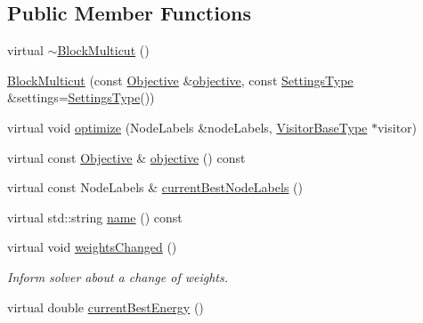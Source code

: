 \subsection*{Public Member Functions}
\begin{DoxyCompactItemize}
\item 
virtual \hyperlink{classnifty_1_1graph_1_1optimization_1_1multicut_1_1BlockMulticut_a79b2fe4e7494b9d433b6f738814f3c81}{$\sim$\+Block\+Multicut} ()
\item 
\hyperlink{classnifty_1_1graph_1_1optimization_1_1multicut_1_1BlockMulticut_a17d06855beeea288f7239376937f2930}{Block\+Multicut} (const \hyperlink{classnifty_1_1graph_1_1optimization_1_1multicut_1_1BlockMulticut_a4687a9c2304a995a612e69abc3b1b37f}{Objective} \&\hyperlink{classnifty_1_1graph_1_1optimization_1_1multicut_1_1BlockMulticut_a0a0c27b7eb28c0cb85b8369ab85e3cc6}{objective}, const \hyperlink{structnifty_1_1graph_1_1optimization_1_1multicut_1_1BlockMulticut_1_1SettingsType}{Settings\+Type} \&settings=\hyperlink{structnifty_1_1graph_1_1optimization_1_1multicut_1_1BlockMulticut_1_1SettingsType}{Settings\+Type}())
\item 
virtual void \hyperlink{classnifty_1_1graph_1_1optimization_1_1multicut_1_1BlockMulticut_a6218a373039f6c1ed7864473af916817}{optimize} (Node\+Labels \&node\+Labels, \hyperlink{classnifty_1_1graph_1_1optimization_1_1multicut_1_1BlockMulticut_a5565253c12963ec0e384ccbaa56f1e5b}{Visitor\+Base\+Type} $\ast$visitor)
\item 
virtual const \hyperlink{classnifty_1_1graph_1_1optimization_1_1multicut_1_1BlockMulticut_a4687a9c2304a995a612e69abc3b1b37f}{Objective} \& \hyperlink{classnifty_1_1graph_1_1optimization_1_1multicut_1_1BlockMulticut_a0a0c27b7eb28c0cb85b8369ab85e3cc6}{objective} () const 
\item 
virtual const Node\+Labels \& \hyperlink{classnifty_1_1graph_1_1optimization_1_1multicut_1_1BlockMulticut_a54d3289a9838283ae51d6c9f61fbd03f}{current\+Best\+Node\+Labels} ()
\item 
virtual std\+::string \hyperlink{classnifty_1_1graph_1_1optimization_1_1multicut_1_1BlockMulticut_af369bbbea2a0ccabc14ee8f60cc61a24}{name} () const 
\item 
virtual void \hyperlink{classnifty_1_1graph_1_1optimization_1_1multicut_1_1BlockMulticut_a17b76451bb092dd543309bef81afa507}{weights\+Changed} ()
\begin{DoxyCompactList}\small\item\em Inform solver about a change of weights. \end{DoxyCompactList}\item 
virtual double \hyperlink{classnifty_1_1graph_1_1optimization_1_1multicut_1_1BlockMulticut_a771ce40d7947b9e53f910a4c969267c4}{current\+Best\+Energy} ()
\end{DoxyCompactItemize}


